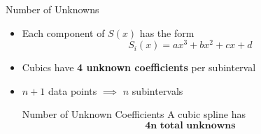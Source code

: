 \documentclass[10pt]{beamer}
\begin{document}
\begin{frame}{Number of Unknowns}

{
}

\begin{itemize}
\item  Each component of $S(x)$ has the form
\begin{equation*}
  S_i(x) = ax^3 + bx^2 + cx + d
\end{equation*}
\vfill 
\item Cubics have \textbf{4 unknown coefficients} per subinterval 
\vfill 
\item $n+1$ data points $\implies$ $n$ subintervals
\vfill
\begin{block}{Number of Unknown Coefficients}
A cubic spline has
$$ \textbf{4n total unknowns}$$
\end{block}
\vfill
\end{itemize}
\end{frame}
\end{document}
